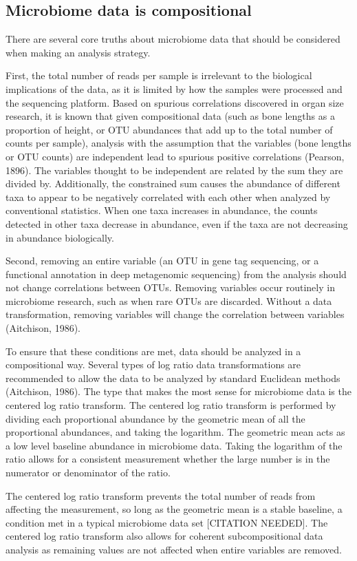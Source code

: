 \subsection{Microbiome data is compositional}
There are several core truths about microbiome data that should be considered when making an analysis strategy.

First, the total number of reads per sample is irrelevant to the biological implications of the data, as it is limited by how the samples were processed and the sequencing platform. Based on spurious correlations discovered in organ size research, it is known that given compositional data (such as bone lengths as a proportion of height, or OTU abundances that add up to the total number of counts per sample), analysis with the assumption that the variables (bone lengths or OTU counts) are independent lead to spurious positive correlations (Pearson, 1896). The variables thought to be independent are related by the sum they are divided by. Additionally, the constrained sum causes the abundance of different taxa to appear to be negatively correlated with each other when analyzed by conventional statistics. When one taxa increases in abundance, the counts detected in other taxa decrease in abundance, even if the taxa are not decreasing in abundance biologically.

Second, removing an entire variable (an OTU in gene tag sequencing, or a functional annotation in deep metagenomic sequencing) from the analysis should not change correlations between OTUs. Removing variables occur routinely in microbiome research, such as when rare OTUs are discarded. Without a data transformation, removing variables will change the correlation between variables (Aitchison, 1986).

To ensure that these conditions are met, data should be analyzed in a compositional way. Several types of log ratio data transformations are recommended to allow the data to be analyzed by standard Euclidean methods (Aitchison, 1986). The type that makes the most sense for microbiome data is the centered log ratio transform. The centered log ratio transform is performed by dividing each proportional abundance by the geometric mean of all the proportional abundances, and taking the logarithm. The geometric mean acts as a low level baseline abundance in microbiome data. Taking the logarithm of the ratio allows for a consistent measurement whether the large number is in the numerator or denominator of the ratio.

The centered log ratio transform prevents the total number of reads from affecting the measurement, so long as the geometric mean is a stable baseline, a condition met in a typical microbiome data set [CITATION NEEDED]. The centered log ratio transform also allows for coherent subcompositional data analysis as remaining values are not affected when entire variables are removed.

